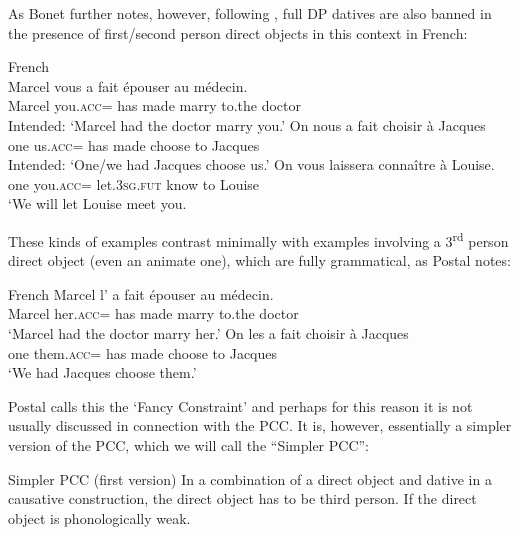 \documentclass[output=paper,colorlinks,citecolor=brown,nonflat]{./langscibook}
\begin{document}
As Bonet further notes, however, following \citet{Postal1989}, full DP datives are also banned in the presence of first/second person direct objects in this context in French:

\ea%
    \label{ex:sheehan:14}
    French \citep[2]{Postal1989}\\
    \ea\label{ex:sheehan:14a}
    \gll    *Marcel vous   a   fait   épouser   au     médecin.\\
            Marcel   you.\textsc{acc}=  has   made   marry   to.the   doctor\\
    \glt    Intended: ‘Marcel had the doctor marry you.’
    \ex\label{ex:sheehan:14b}
    \gll    *On   nous     a   fait     choisir   à Jacques\\
            one     us.\textsc{acc}= has   made   choose   to Jacques\\
    \glt    Intended: ‘One/we had Jacques choose us.’
    \ex\label{ex:sheehan:14c}
    \gll    *On   vous   laissera   connaître   à Louise.\\
            one   you\textsc{.acc}=  let.\textsc{3sg.fut} know     to Louise\\
    \glt    ‘We will let Louise meet you.
    \z
\z

These kinds of examples contrast minimally with examples involving a 3\textsuperscript{rd} person direct object (even an animate one), which are fully grammatical, as Postal notes:

\ea%
    \label{ex:sheehan:15}
    French \citep[2]{Postal1989}
    \ea\label{ex:sheehan:15a}
    \gll  Marcel   l’       a  fait    épouser   au     médecin.\\
            Marcel   her\textsc{.acc}=  has  made    marry   to.the   doctor\\
    \glt      ‘Marcel had the doctor marry her.’
    \ex\label{ex:sheehan:15b}
    \gll    On   les       a   fait     choisir   à Jacques\\
            one   them.\textsc{acc}=  has   made   choose   to Jacques\\
    \glt    ‘We had Jacques choose them.’
    \z
\z

Postal calls this the ‘Fancy Constraint’ and perhaps for this reason it is not usually discussed in connection with the PCC. It is, however, essentially a simpler version of the PCC, which we will call the ``Simpler PCC'':

\ea%
    \label{ex:sheehan:16}
    Simpler PCC (first version)
    \ea\label{ex:sheehan:16a}
    In a combination of a direct object and dative in a causative construction, the direct object has to be third person.
    \ex\label{ex:sheehan:16b}
    If the direct object is phonologically weak. 
    \z
\z
\end{document}

